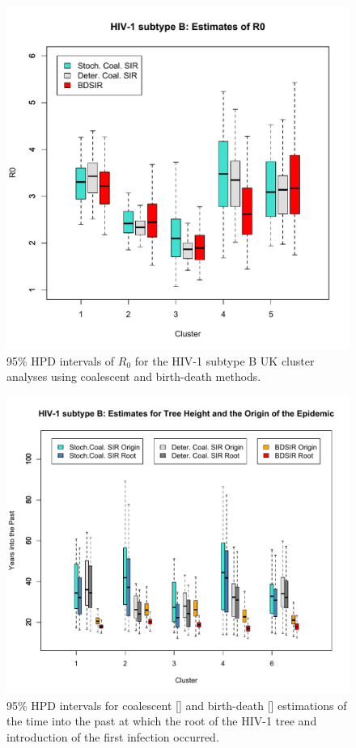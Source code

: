 \documentclass[10pt]{article}
\begin{document}
\begin{figure}[!ht]
\begin{center}
\includegraphics[width=\textwidth]{HIV1subtypeB_R0.pdf}
\end{center}
\caption{
95\% HPD intervals of $R_0$ for the HIV-1 subtype B UK cluster 
analyses using coalescent and birth-death methods.}
\label{fig:HIV_R0}
\end{figure}
%
\begin{figure}[!ht]
\begin{center}
\includegraphics[width=\textwidth]{HIV1subtypeB_treeHeight_Origin.pdf}
\end{center}
\caption{
95\% HPD intervals for coalescent [\protect\cite{Volz:2012}] and birth-death [\protect\cite{Kuhnert:2014}]
estimations of the time into the past at which the root of the HIV-1 tree and introduction 
of the first infection occurred.}
\label{fig:HIV_HeightandOrigin}
\end{figure}
\end{document}
